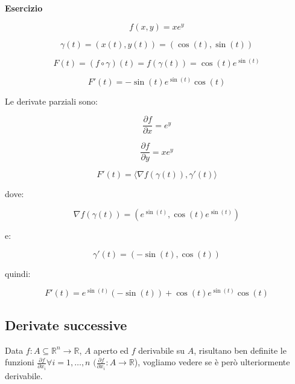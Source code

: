 \documentclass[../appunti-analisi.tex]{subfiles}
\begin{document}
\textbf{Esercizio} 

\[
    f(x,y)= x e ^{y}
\]

\[
    \gamma(t) = (x(t), y(t)) = (\cos (t) , \sin (t))
\]

\[
    F(t) = (f \circ \gamma) (t) = f(\gamma(t)) = \cos (t) e ^{\sin (t)}
\]

\[
    F'(t) = -\sin (t) e ^{\sin (t)} \cos (t)
\]

Le derivate parziali sono:

\[
    \frac{\partial f}{\partial x} = e ^{y} 
\]

\[
    \frac{\partial f}{\partial y} = x e ^{y}
\]

\[
    F'(t) = \langle \nabla f(\gamma(t)), \gamma'(t) \rangle  
\]

dove:

\[
    \nabla f(\gamma(t)) = (e ^{\sin (t)}, \cos (t) e ^{\sin (t)})
\]

e:

\[
    \gamma'(t) = (-\sin (t), \cos (t))
\]

quindi:

\[
    F'(t) = e ^{\sin(t)} (- \sin (t)) + \cos (t) e ^{\sin (t)}\cos (t)
\]


\newpage

\subsection{Derivate successive}

Data $f: A \subseteq \mathbb{R}^{n} \rightarrow \mathbb{R}$, $A$ aperto ed $f$ derivabile su $A$, risultano ben definite le funzioni $\frac{\partial f}{\partial x_i} \forall i=1,\ldots,n$ $(\frac{\partial f}{\partial x_i}: A \rightarrow \mathbb{R}$), vogliamo vedere se è però ulteriormente derivabile.

\end{document}
